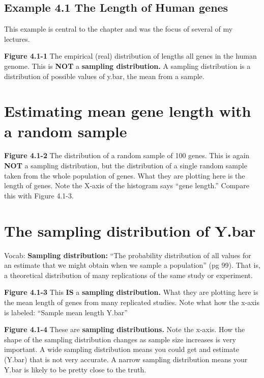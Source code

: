\documentclass[]{book}
\theoremstyle{definition}
\theoremstyle{definition}
\theoremstyle{definition}
\theoremstyle{remark}
\begin{document}
\subsection{Example 4.1 The Length of Human
genes}\label{example-4.1-the-length-of-human-genes}

This example is central to the chapter and was the focus of several of
my lectures.

\textbf{Figure 4.1-1} The empirical (real) distribution of lengths all
genes in the human genome. This is \textbf{NOT} a \textbf{sampling
distribution.} A sampling distribution is a distribution of possible
values of y.bar, the mean from a sample.

\section{Estimating mean gene length with a random
sample}\label{estimating-mean-gene-length-with-a-random-sample}

\textbf{Figure 4.1-2} The distribution of a random sample of 100 genes.
This is again \textbf{NOT} a sampling distribution, but the distribution
of a single random sample taken from the whole population of genes. What
they are plotting here is the length of genes. Note the X-axis of the
histogram says ``gene length.'' Compare this with Figure 4.1-3.

\section{The sampling distribution of
Y.bar}\label{the-sampling-distribution-of-y.bar}

Vocab: \textbf{Sampling distribution:} ``The probability distribution of
all values for an estimate that we might obtain when we sample a
population'' (pg 99). That is, a theoretical distribution of many
replications of the same study or experiment.

\textbf{Figure 4.1-3} This \textbf{IS} a \textbf{sampling distribution.}
What they are plotting here is the mean length of genes from many
replicated studies. Note what how the x-axis is labeled: ``Sample mean
length Y.bar''

\textbf{Figure 4.1-4} These are \textbf{sampling distributions.} Note
the x-axis. How the shape of the sampling distribution changes as sample
size increases is very important. A wide sampling distribution means you
could get and estimate (Y.bar) that is not very accurate. A narrow
sampling distribution means your Y.bar is likely to be pretty close to
the truth.
\end{document}
